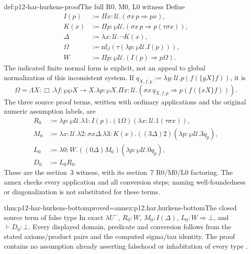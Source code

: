 \begin{hbdefinition}{def:p12-har-hurkens-proof}{The full R0, M0, L0 witness}
Define
\[
\begin{aligned}
 I(p)&:=\Pi x:\mathcal U.(\sigma x\,p\Rightarrow px),\\
 K(x)&:=\Pi p:\wp\mathcal U.
               (\sigma x\,p\Rightarrow p(\tau\sigma x)),\\
 \Delta&:=\lambda x:\mathcal U.\neg K(x),\\
 \Omega&:=\mathrm{nf}_\beta
                (\tau(\lambda p:\wp\mathcal U.I(p))),\\
 W&:=\Pi p:\wp\mathcal U.(I(p)\Rightarrow p\Omega).
\end{aligned}
\]
The indicated finite normal form is explicit, not an appeal to global
normalization of this inconsistent system. If
\(q_{X,f,p}:=\lambda y:\mathcal U.p(f(\{yX\}f))\), it is
\[
 \Omega=\Lambda X:\Box.\lambda f:\wp\wp X\to X.
 \lambda p:\wp X.
 \Pi x:\mathcal U.
    (\sigma x\,q_{X,f,p}\Rightarrow p(f(\{xX\}f))).
\]
The three source proof terms, written with ordinary applications and
the original numeric assumption labels, are
\[
\begin{aligned}
 R_0&:=\lambda p:\wp\mathcal U.\lambda1:I(p).
            (1\Omega)(\lambda x:\mathcal U.1(\tau\sigma x)),\\
 M_0&:=\lambda x:\mathcal U.\lambda2:\sigma x\Delta.
       \lambda3:K(x).
       ((3\Delta)2)(\lambda p:\wp\mathcal U.3q_p),\\
 L_0&:=\lambda0:W.
       ((0\Delta)M_0)(\lambda p:\wp\mathcal U.0q_p),\\
 D_0&:=L_0R_0.
\end{aligned}
\]
These are the section~3 witness, with its section~7 R0/M0/L0 factoring.
The annex checks every application and all conversion steps; naming
well-foundedness or diagonalization is not substituted for these terms.
\end{hbdefinition}

\begin{hbtheorem}{thm:p12-har-hurkens-bottom}{proved=annex:p12.har.hurkens-bottom}{The closed source term of false type}
In exact \(\lambda U^-\),
\(R_0:W\), \(M_0:I(\Delta)\), \(L_0:W\Rightarrow\bot\),
and \(\vdash D_0:\bot\). Every displayed domain, predicate and
conversion follows from the stated axioms/product pairs and the computed
sigma/tau identity. The proof contains no assumption already asserting
falsehood or inhabitation of every type
\cite[sections~3 and 7, pp.~269,276--277]{Hurkens1995LambdaStar}.
\end{hbtheorem}

